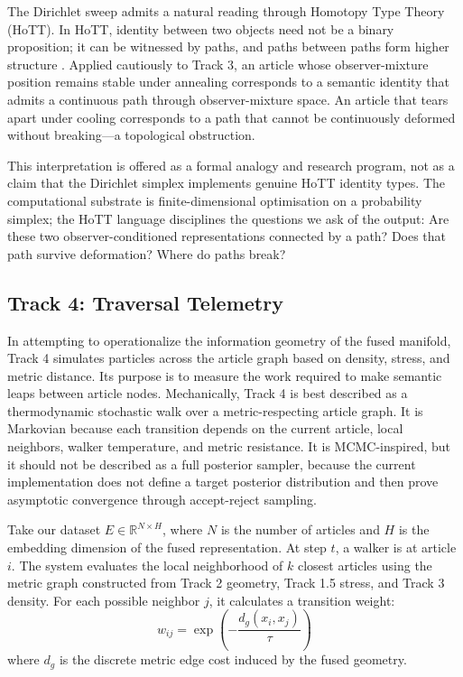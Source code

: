 The Dirichlet sweep admits a natural reading through Homotopy Type Theory (HoTT). In HoTT, identity between two objects need not be a binary proposition; it can be witnessed by paths, and paths between paths form higher structure \citep{hottbook2013}. Applied cautiously to Track 3, an article whose observer-mixture position remains stable under annealing corresponds to a semantic identity that admits a continuous path through observer-mixture space. An article that tears apart under cooling corresponds to a path that cannot be continuously deformed without breaking---a topological obstruction.

This interpretation is offered as a formal analogy and research program, not as a claim that the Dirichlet simplex implements genuine HoTT identity types. The computational substrate is finite-dimensional optimisation on a probability simplex; the HoTT language disciplines the questions we ask of the output: Are these two observer-conditioned representations connected by a path? Does that path survive deformation? Where do paths break?

\subsection{Track 4: Traversal Telemetry}

In attempting to operationalize the information geometry of the fused manifold, Track 4 simulates particles across the article graph based on density, stress, and metric distance. Its purpose is to measure the work required to make semantic leaps between article nodes. Mechanically, Track 4 is best described as a thermodynamic stochastic walk over a metric-respecting article graph. It is Markovian because each transition depends on the current article, local neighbors, walker temperature, and metric resistance. It is MCMC-inspired, but it should not be described as a full posterior sampler, because the current implementation does not define a target posterior distribution and then prove asymptotic convergence through accept-reject sampling.

Take our dataset $E \in \mathbb{R}^{N \times H}$, where $N$ is the number of articles and $H$ is the embedding dimension of the fused representation. At step $t$, a walker is at article $i$. The system evaluates the local neighborhood of $k$ closest articles using the metric graph constructed from Track 2 geometry, Track 1.5 stress, and Track 3 density. For each possible neighbor $j$, it calculates a transition weight:
\begin{equation}
    w_{ij} = \exp\left(-\frac{d_g(x_i,x_j)}{\tau}\right)
\end{equation}
where $d_g$ is the discrete metric edge cost induced by the fused geometry.

